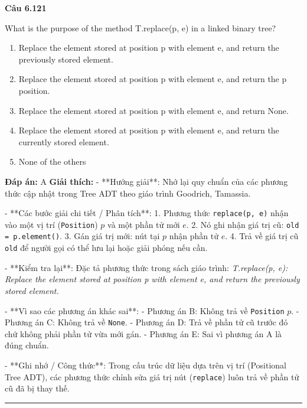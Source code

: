 \documentclass[11pt,a4paper]{article}
\newenvironment{question}[1]{%
  \par\vspace{1em}\noindent\textbf{\large Câu #1}\par\vspace{0.4em}
}{%
  \par\vspace{1em}\hrule\vspace{0.6em}
}
\newenvironment{choices}{%
  \begin{enumerate}[label=\textbf{\Alph*.},leftmargin=2.2em,itemsep=2pt,topsep=3pt]
}{%
  \end{enumerate}
}
\newcommand{\choice}{\item}
\begin{document}
\begin{question}{6.121}
What is the purpose of the method T.replace(p, e) in a linked binary tree?
\begin{choices}
\choice Replace the element stored at position p with element e, and return the previously stored element.
\choice Replace the element stored at position p with element e, and return the p position.
\choice Replace the element stored at position p with element e, and return None.
\choice Replace the element stored at position p with element e, and return the currently stored element.
\choice None of the others
\end{choices}
\textbf{Đáp án:} A
\textbf{Giải thích:} - **Hướng giải**:
Nhớ lại quy chuẩn của các phương thức cập nhật trong Tree ADT theo giáo trình Goodrich, Tamassia.


- **Các bước giải chi tiết / Phân tích**:
1. Phương thức \texttt{replace(p, e)} nhận vào một vị trí (\texttt{Position}) \(p\) và một phần tử mới \(e\).
2. Nó ghi nhận giá trị cũ: \texttt{old = p.element()}.
3. Gán giá trị mới: nút tại \(p\) nhận phần tử \(e\).
4. Trả về giá trị cũ \texttt{old} để người gọi có thể lưu lại hoặc giải phóng nếu cần.


- **Kiểm tra lại**:
Đặc tả phương thức trong sách giáo trình:
\textit{T.replace(p, e): Replace the element stored at position p with element e, and return the previously stored element.}


- **Vì sao các phương án khác sai**:
- Phương án B: Không trả về \texttt{Position} \(p\).
- Phương án C: Không trả về \texttt{None}.
- Phương án D: Trả về phần tử cũ trước đó chứ không phải phần tử vừa mới gán.
- Phương án E: Sai vì phương án A là đúng chuẩn.


- **Ghi nhớ / Công thức**:
Trong cấu trúc dữ liệu dựa trên vị trí (Positional Tree ADT), các phương thức chỉnh sửa giá trị nút (\texttt{replace}) luôn trả về phần tử cũ đã bị thay thế.
\end{question}
\end{document}
